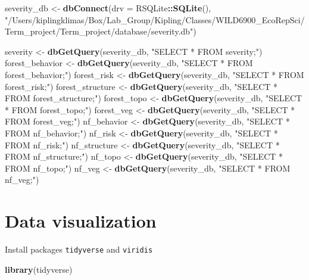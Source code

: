 \documentclass[]{book}
\newenvironment{Shaded}{\begin{snugshade}}{\end{snugshade}}
\newcommand{\DataTypeTok}[1]{\textcolor[rgb]{0.13,0.29,0.53}{#1}}
\newcommand{\KeywordTok}[1]{\textcolor[rgb]{0.13,0.29,0.53}{\textbf{#1}}}
\newcommand{\NormalTok}[1]{#1}
\newcommand{\OperatorTok}[1]{\textcolor[rgb]{0.81,0.36,0.00}{\textbf{#1}}}
\newcommand{\StringTok}[1]{\textcolor[rgb]{0.31,0.60,0.02}{#1}}
\begin{document}
\begin{Shaded}
\begin{Highlighting}[]
\NormalTok{severity_db <-}\StringTok{ }\KeywordTok{dbConnect}\NormalTok{(}\DataTypeTok{drv =}\NormalTok{ RSQLite}\OperatorTok{::}\KeywordTok{SQLite}\NormalTok{(),}
                \StringTok{"/Users/kiplingklimas/Box/Lab_Group/Kipling/Classes/WILD6900_EcoRepSci/Term_project/Term_project/database/severity.db"}\NormalTok{)}

\NormalTok{severity <-}\StringTok{ }\KeywordTok{dbGetQuery}\NormalTok{(severity_db, }\StringTok{"SELECT * FROM severity;"}\NormalTok{)}
\NormalTok{forest_behavior <-}\StringTok{ }\KeywordTok{dbGetQuery}\NormalTok{(severity_db, }\StringTok{"SELECT * FROM forest_behavior;"}\NormalTok{)}
\NormalTok{forest_risk <-}\StringTok{ }\KeywordTok{dbGetQuery}\NormalTok{(severity_db, }\StringTok{"SELECT * FROM forest_risk;"}\NormalTok{)}
\NormalTok{forest_structure <-}\StringTok{ }\KeywordTok{dbGetQuery}\NormalTok{(severity_db, }\StringTok{"SELECT * FROM forest_structure;"}\NormalTok{)}
\NormalTok{forest_topo <-}\StringTok{ }\KeywordTok{dbGetQuery}\NormalTok{(severity_db, }\StringTok{"SELECT * FROM forest_topo;"}\NormalTok{)}
\NormalTok{forest_veg <-}\StringTok{ }\KeywordTok{dbGetQuery}\NormalTok{(severity_db, }\StringTok{"SELECT * FROM forest_veg;"}\NormalTok{)}
\NormalTok{nf_behavior <-}\StringTok{ }\KeywordTok{dbGetQuery}\NormalTok{(severity_db, }\StringTok{"SELECT * FROM nf_behavior;"}\NormalTok{)}
\NormalTok{nf_risk <-}\StringTok{ }\KeywordTok{dbGetQuery}\NormalTok{(severity_db, }\StringTok{"SELECT * FROM nf_risk;"}\NormalTok{)}
\NormalTok{nf_structure <-}\StringTok{ }\KeywordTok{dbGetQuery}\NormalTok{(severity_db, }\StringTok{"SELECT * FROM nf_structure;"}\NormalTok{)}
\NormalTok{nf_topo <-}\StringTok{ }\KeywordTok{dbGetQuery}\NormalTok{(severity_db, }\StringTok{"SELECT * FROM nf_topo;"}\NormalTok{)}
\NormalTok{nf_veg <-}\StringTok{ }\KeywordTok{dbGetQuery}\NormalTok{(severity_db, }\StringTok{"SELECT * FROM nf_veg;"}\NormalTok{)}
\end{Highlighting}
\end{Shaded}

\hypertarget{tidyverse}{%
\chapter{Data visualization}\label{tidyverse}}

Install packages \texttt{tidyverse} and \texttt{viridis}

\begin{Shaded}
\begin{Highlighting}[]
\KeywordTok{library}\NormalTok{(tidyverse)}
\end{Highlighting}
\end{Shaded}
\end{document}
